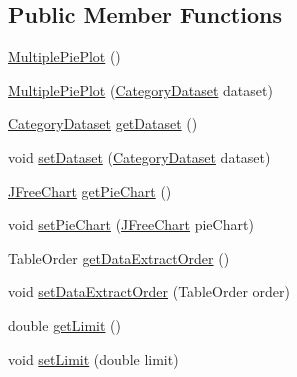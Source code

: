 \subsection*{Public Member Functions}
\begin{DoxyCompactItemize}
\item 
\mbox{\hyperlink{classorg_1_1jfree_1_1chart_1_1plot_1_1_multiple_pie_plot_aa5a3eeeff39970bfcb73bb18ce8c1cf9}{Multiple\+Pie\+Plot}} ()
\item 
\mbox{\hyperlink{classorg_1_1jfree_1_1chart_1_1plot_1_1_multiple_pie_plot_a59fe121b3b183941f40ec010d106b8ba}{Multiple\+Pie\+Plot}} (\mbox{\hyperlink{interfaceorg_1_1jfree_1_1data_1_1category_1_1_category_dataset}{Category\+Dataset}} dataset)
\item 
\mbox{\hyperlink{interfaceorg_1_1jfree_1_1data_1_1category_1_1_category_dataset}{Category\+Dataset}} \mbox{\hyperlink{classorg_1_1jfree_1_1chart_1_1plot_1_1_multiple_pie_plot_a8bd0f9380c87b13975efd9c62e9a8584}{get\+Dataset}} ()
\item 
void \mbox{\hyperlink{classorg_1_1jfree_1_1chart_1_1plot_1_1_multiple_pie_plot_a9a348ffb3a2685730c91b4411192d0a2}{set\+Dataset}} (\mbox{\hyperlink{interfaceorg_1_1jfree_1_1data_1_1category_1_1_category_dataset}{Category\+Dataset}} dataset)
\item 
\mbox{\hyperlink{classorg_1_1jfree_1_1chart_1_1_j_free_chart}{J\+Free\+Chart}} \mbox{\hyperlink{classorg_1_1jfree_1_1chart_1_1plot_1_1_multiple_pie_plot_ab8664cb990f572f73346eba4053741b0}{get\+Pie\+Chart}} ()
\item 
void \mbox{\hyperlink{classorg_1_1jfree_1_1chart_1_1plot_1_1_multiple_pie_plot_a781207ab169b3063bbfab48cfa4c133d}{set\+Pie\+Chart}} (\mbox{\hyperlink{classorg_1_1jfree_1_1chart_1_1_j_free_chart}{J\+Free\+Chart}} pie\+Chart)
\item 
Table\+Order \mbox{\hyperlink{classorg_1_1jfree_1_1chart_1_1plot_1_1_multiple_pie_plot_a7963c0f2d0a8d71ae77be0276a6be313}{get\+Data\+Extract\+Order}} ()
\item 
void \mbox{\hyperlink{classorg_1_1jfree_1_1chart_1_1plot_1_1_multiple_pie_plot_aea81ac70a3b4f07b90793819828fa9a9}{set\+Data\+Extract\+Order}} (Table\+Order order)
\item 
double \mbox{\hyperlink{classorg_1_1jfree_1_1chart_1_1plot_1_1_multiple_pie_plot_aa3776a88da5002af69ec36a68633c770}{get\+Limit}} ()
\item 
void \mbox{\hyperlink{classorg_1_1jfree_1_1chart_1_1plot_1_1_multiple_pie_plot_af7c1fcbb279f6d5e2e3cf425e1390fc5}{set\+Limit}} (double limit)

\end{DoxyCompactItemize}
